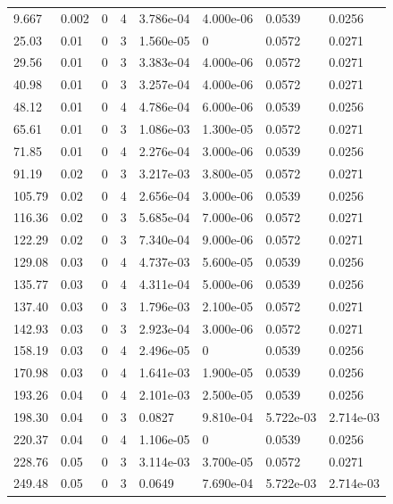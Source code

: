 \documentclass[preview]{standalone}
\begin{document}
{{\begin{tabular}{L{1.2cm}C{1.2cm} C{0.3cm}C{0.5cm} C{1.4cm}C{1.4cm} C{1.4cm}C{1.4cm}}
  9.667  &  0.002  & 0     &  4 &  3.786e-04  & 4.000e-06  & 0.0539 &  0.0256   \\ 
  25.03  &  0.01  & 0     &  3 &  1.560e-05  & 0  & 0.0572 &  0.0271   \\ 
  29.56  &  0.01  & 0     &  3 &  3.383e-04  & 4.000e-06  & 0.0572 &  0.0271   \\ 
  40.98  &  0.01  & 0     &  3 &  3.257e-04  & 4.000e-06  & 0.0572 &  0.0271   \\ 
  48.12  &  0.01  & 0     &  4 &  4.786e-04  & 6.000e-06  & 0.0539 &  0.0256   \\ 
  65.61  &  0.01  & 0     &  3 &  1.086e-03  & 1.300e-05  & 0.0572 &  0.0271   \\ 
  71.85  &  0.01  & 0     &  4 &  2.276e-04  & 3.000e-06  & 0.0539 &  0.0256   \\ 
  91.19  &  0.02  & 0     &  3 &  3.217e-03  & 3.800e-05  & 0.0572 &  0.0271   \\ 
  105.79  &  0.02  & 0     &  4 &  2.656e-04  & 3.000e-06  & 0.0539 &  0.0256   \\ 
  116.36  &  0.02  & 0     &  3 &  5.685e-04  & 7.000e-06  & 0.0572 &  0.0271   \\ 
  122.29  &  0.02  & 0     &  3 &  7.340e-04  & 9.000e-06  & 0.0572 &  0.0271   \\ 
  129.08  &  0.03  & 0     &  4 &  4.737e-03  & 5.600e-05  & 0.0539 &  0.0256   \\ 
  135.77  &  0.03  & 0     &  4 &  4.311e-04  & 5.000e-06  & 0.0539 &  0.0256   \\ 
  137.40  &  0.03  & 0     &  3 &  1.796e-03  & 2.100e-05  & 0.0572 &  0.0271   \\ 
  142.93  &  0.03  & 0     &  3 &  2.923e-04  & 3.000e-06  & 0.0572 &  0.0271   \\ 
  158.19  &  0.03  & 0     &  4 &  2.496e-05  & 0  & 0.0539 &  0.0256   \\ 
  170.98  &  0.03  & 0     &  4 &  1.641e-03  & 1.900e-05  & 0.0539 &  0.0256   \\ 
  193.26  &  0.04  & 0     &  4 &  2.101e-03  & 2.500e-05  & 0.0539 &  0.0256   \\ 
  198.30  &  0.04  & 0     &  3 &  0.0827  & 9.810e-04  & 5.722e-03 &  2.714e-03   \\ 
  220.37  &  0.04  & 0     &  4 &  1.106e-05  & 0  & 0.0539 &  0.0256   \\ 
  228.76  &  0.05  & 0     &  3 &  3.114e-03  & 3.700e-05  & 0.0572 &  0.0271   \\ 
  249.48  &  0.05  & 0     &  3 &  0.0649  & 7.690e-04  & 5.722e-03 &  2.714e-03   \\ 

\end{tabular}}}
\end{document}

